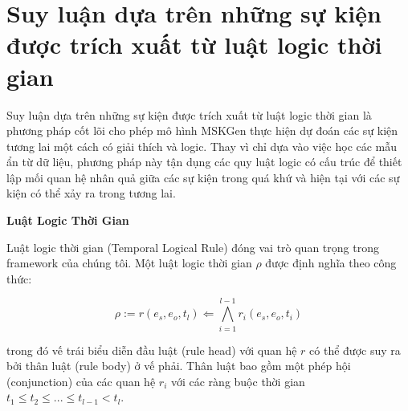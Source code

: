 





\section{Suy luận dựa trên những sự kiện được trích xuất từ luật logic thời gian}

Suy luận dựa trên những sự kiện được trích xuất từ luật logic thời gian là phương pháp cốt lõi cho phép mô hình MSKGen thực hiện dự đoán các sự kiện tương lai một cách có giải thích và logic. Thay vì chỉ dựa vào việc học các mẫu ẩn từ dữ liệu, phương pháp này tận dụng các quy luật logic có cấu trúc để thiết lập mối quan hệ nhân quả giữa các sự kiện trong quá khứ và hiện tại với các sự kiện có thể xảy ra trong tương lai.

\textbf{Luật Logic Thời Gian}

Luật logic thời gian (Temporal Logical Rule) đóng vai trò quan trọng trong framework của chúng tôi. Một luật logic thời gian $\rho$ được định nghĩa theo công thức:

\[
\rho := r(e_s, e_o, t_l) \Leftarrow \bigwedge_{i=1}^{l-1} r_i(e_s, e_o, t_i)
\]

trong đó vế trái biểu diễn đầu luật (rule head) với quan hệ $r$ có thể được suy ra bởi thân luật (rule body) ở vế phải. Thân luật bao gồm một phép hội (conjunction) của các quan hệ $r_i$ với các ràng buộc thời gian $t_1 \leq t_2 \leq ... \leq t_{l-1} < t_l$.


